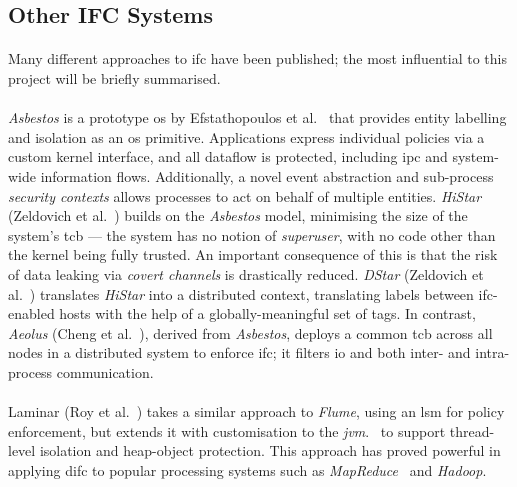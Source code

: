 \subsection{Other IFC Systems}
\paragraph{} Many different approaches to \acrshort{ifc} have been published; the most influential to this project will be briefly summarised.

\paragraph{} \textit{Asbestos} is a prototype \acrshort{os} by Efstathopoulos et al.~\cite{asbestos} that provides entity labelling and isolation as an \acrshort{os} primitive. Applications express individual policies via a custom kernel interface, and all dataflow is protected, including \acrshort{ipc} and system-wide information flows. Additionally, a novel event abstraction and sub-process \textit{security contexts} allows processes to act on behalf of multiple entities. \textit{HiStar} (Zeldovich et al.~\cite{10.5555/1298455.1298481}) builds on the \textit{Asbestos} model, minimising the size of the system's \acrshort{tcb} --- the system has no notion of \textit{superuser}, with no code other than the kernel being fully trusted. An important consequence of this is that the risk of data leaking via \textit{covert channels} is drastically reduced. \textit{DStar} (Zeldovich et al.~\cite{10.5555/1387589.1387610}) translates \textit{HiStar} into a distributed context, translating labels between \acrshort{ifc}-enabled hosts with the help of a globally-meaningful set of tags. In contrast, \textit{Aeolus} (Cheng et al.~\cite{10.5555/2342821.2342833}), derived from \textit{Asbestos}, deploys a common \acrshort{tcb} across all nodes in a distributed system to enforce \acrshort{ifc}; it filters \acrshort{io} and both inter- and intra- process communication.

\paragraph{} Laminar (Roy et al.~\cite{10.1145/1543135.1542484}) takes a similar approach to \textit{Flume}, using an \acrshort{lsm} for policy enforcement, but extends it with customisation to the \textit{\acrfull{jvm}}.~\cite{jvm} to support thread-level isolation and heap-object protection. This approach has proved powerful in applying \acrshort{difc} to popular processing systems such as \textit{MapReduce}~\cite{mapreduce} and \textit{Hadoop}.~\cite{hadoop}



